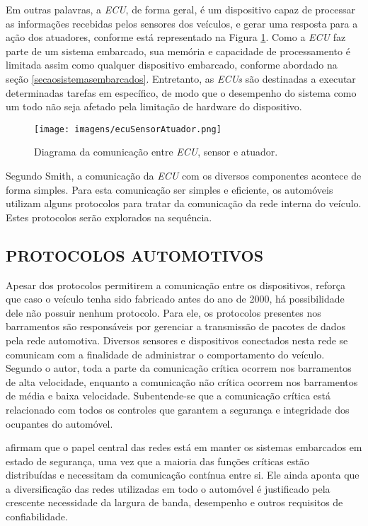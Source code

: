 Em outras palavras, a \textit{ECU}, de forma geral, é um dispositivo capaz de processar as informações recebidas pelos sensores dos veículos, e gerar uma resposta para a ação dos atuadores, conforme está representado na Figura \ref{Fig:relacao_ecu_sensor_atuador}. Como a \textit{ECU} faz parte de um sistema embarcado, sua memória e capacidade de processamento é limitada assim como qualquer dispositivo embarcado, conforme abordado na seção \ref{secaosistemasembarcados}. Entretanto, as \textit{ECUs} são destinadas a executar determinadas tarefas em específico, de modo que o desempenho do sistema como um todo não seja afetado pela limitação de hardware do dispositivo.

\begin{figure}[!ht]
\centering
\caption{Diagrama da comunicação entre \textit{ECU}, sensor e atuador.} 
{\texttt{[image: imagens/ecuSensorAtuador.png]}}\\
 \label{Fig:relacao_ecu_sensor_atuador}
\end{figure}

Segundo Smith, a comunicação da \textit{ECU} com os diversos componentes acontece de forma simples. Para esta comunicação ser simples e eficiente, os automóveis utilizam alguns protocolos para tratar da comunicação da rede interna do veículo. Estes protocolos serão explorados na sequência.

\subsection{PROTOCOLOS AUTOMOTIVOS}
Apesar dos protocolos permitirem a comunicação entre os dispositivos,  reforça que caso o veículo tenha sido fabricado antes do ano de 2000, há possibilidade dele não possuir nenhum protocolo. Para ele, os protocolos presentes nos barramentos são responsáveis por gerenciar a transmissão de pacotes de dados pela rede automotiva. Diversos sensores e dispositivos conectados nesta rede se comunicam com a finalidade de administrar o comportamento do veículo. Segundo o autor, toda a parte da comunicação crítica ocorrem nos barramentos de alta velocidade, enquanto a comunicação não crítica ocorrem nos barramentos de média e baixa velocidade. Subentende-se que a comunicação crítica está relacionado com todos os controles que garantem a segurança e integridade dos ocupantes do automóvel. 

 afirmam que o papel central das redes está em manter os sistemas embarcados em estado de segurança, uma vez que a maioria das funções críticas estão distribuídas e necessitam da comunicação contínua entre si. Ele ainda aponta que a diversificação das redes utilizadas em todo o automóvel é justificado pela crescente necessidade da largura de banda, desempenho e outros requisitos de confiabilidade.


